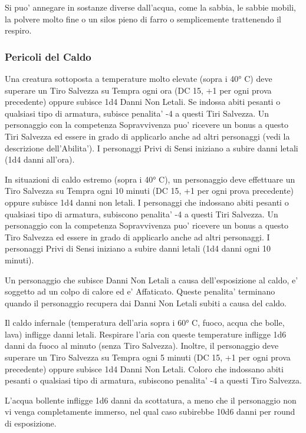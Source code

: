 \documentclass[a4paper,11pt,twoside,openany]{dndbook}
\begin{document}
{Si puo' annegare in sostanze diverse dall'acqua, come la sabbia, le sabbie mobili, la polvere molto fine o un silos pieno di farro o semplicemente trattenendo il respiro.

\subsubsection{Pericoli del Caldo}

\label{pericoli-del-caldo}

Una creatura sottoposta a temperature molto elevate (sopra i 40° C) deve superare un Tiro Salvezza su Tempra ogni ora (DC 15, +1 per ogni prova precedente) oppure subisce 1d4 Danni Non Letali. Se indossa abiti pesanti o qualsiasi tipo di armatura, subisce penalita' -4 a questi Tiri Salvezza. Un personaggio con la competenza Sopravvivenza puo' ricevere un bonus a questo Tiri Salvezza ed essere in grado di applicarlo anche ad altri personaggi (vedi la descrizione dell'Abilita'). I personaggi Privi di Sensi iniziano a subire danni letali (1d4 danni all'ora).

In situazioni di caldo estremo (sopra i 40° C), un personaggio deve effettuare un Tiro Salvezza su Tempra ogni 10 minuti (DC 15, +1 per ogni prova precedente) oppure subisce 1d4 danni non letali. I personaggi che indossano abiti pesanti o qualsiasi tipo di armatura, subiscono penalita' -4 a questi Tiri Salvezza. Un personaggio con la competenza Sopravvivenza puo' ricevere un bonus a questo Tiro Salvezza ed essere in grado di applicarlo anche ad altri personaggi. I personaggi Privi di Sensi iniziano a subire danni letali (1d4 danni ogni 10 minuti).

Un personaggio che subisce Danni Non Letali a causa dell'esposizione al caldo, e' soggetto ad un colpo di calore ed e' Affaticato. Queste penalita' terminano quando il personaggio recupera dai Danni Non Letali subiti a causa del caldo.

Il caldo infernale (temperatura dell'aria sopra i 60° C, fuoco, acqua che bolle, lava) infligge danni letali. Respirare l'aria con queste temperature infligge 1d6 danni da fuoco al minuto (senza Tiro Salvezza). 
Inoltre, il personaggio deve superare un Tiro Salvezza su Tempra ogni 5 minuti (DC 15, +1 per ogni prova precedente) oppure subisce 1d4 Danni Non Letali. Coloro che indossano abiti pesanti o qualsiasi tipo di armatura, subiscono penalita' -4 a questi Tiro Salvezza.

L'acqua bollente infligge 1d6 danni da scottatura, a meno che il personaggio non vi venga completamente immerso, nel qual caso subirebbe 10d6 danni per round di esposizione.

}
\end{document}
